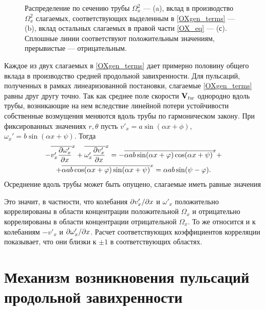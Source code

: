 \begin{figure}
\caption{Распределение по сечению трубы $\Omega_x^2$ --- (a), вклад в производство $\Omega_x^2$ слагаемых, соответствующих выделенным в \eqref{OXgen_terms} --- (b), вклад остальных слагаемых в правой части \eqref{OX_eq} --- (с). Сплошные линии соответствуют положительным значениям, прерывистые --- отрицательным.}
\label{OXgen_pic}
\end{figure}


Каждое из двух слагаемых в \eqref{OXgen_terms} дает примерно половину общего вклада в производство средней продольной завихренности. Для пульсаций, полученных в рамках линеаризованной постановки, слагаемые \eqref{OXgen_terms} равны друг другу точно. Так как среднее поле скорости $\mathbf{V}_{tw}$ однородно вдоль трубы, возникающие на нем вследствие линейной потери устойчивости собственные возмущения меняются вдоль трубы по гармоническом закону. При фиксированных значениях $r, \theta$ пусть $v'_x = a \sin(\alpha x + \phi)$, $\omega_x' = b \sin(\alpha x + \psi)$. Тогда 
\begin{multline}
 - \overline{v'_x \frac{\partial \omega'_x}{\partial x}}^x + \overline{\omega'_x \frac{\partial v'_x}{\partial x}}^x = 
- \overline{\alpha a b \sin(\alpha x + \varphi) \cos(\alpha x + \psi)}^x + \\ +
\overline{\alpha a b \cos(\alpha x + \varphi) \sin(\alpha x + \psi)}^x = \alpha a b \sin(\psi - \varphi).
\end{multline}
Осреднение вдоль трубы может быть опущено, слагаемые иметь равные значения 

Это значит, в частности, что колебания $\partial v'_x/\partial x$ и $\omega'_x$ положительно коррелированы в области концентрации положительной $\Omega_x$ и отрицательно коррелированы в области концентрации отрицательной $\Omega_x$. То же относится и к колебаниям $-v'_x$ и $\partial \omega'_x/\partial x$. Расчет соответствующих коэффициентов корреляции показывает, что они близки к $\pm1$ в соответствующих областях. 


\section{Механизм возникновения пульсаций продольной завихренности}

